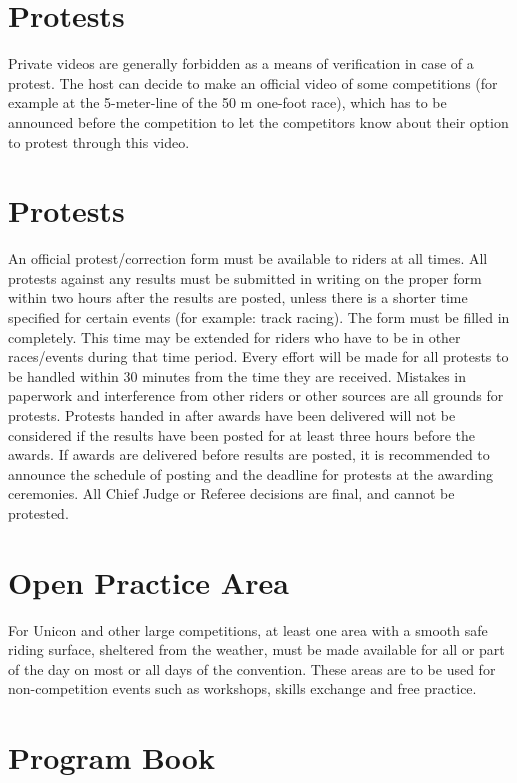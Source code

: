 \section{Protests}

Private videos are generally forbidden as a means of verification in case of a protest. 
The host can decide to make an official video of some competitions (for example at the 5-meter-line of the 50 m one-foot race), which has to be announced before the competition to let the competitors know about their option to protest through this video.

\section{Protests}
An official protest/correction form must be available to riders at all times.
All protests against any results must be submitted in writing on the proper form within two hours after the results are posted, unless there is a shorter time specified for certain events (for example: track racing).
The form must be filled in completely.
This time may be extended for riders who have to be in other races/events during that time period.
Every effort will be made for all protests to be handled within 30 minutes from the time they are received.
Mistakes in paperwork and interference from other riders or other sources are all grounds for protests.
Protests handed in after awards have been delivered will not be considered if the results have been posted for at least three hours before the awards.
If awards are delivered before results are posted, it is recommended to announce the schedule of posting and the deadline for protests at the awarding ceremonies.
All Chief Judge or Referee decisions are final, and cannot be protested.

\section{Open Practice Area}
For Unicon and other large competitions, at least one area with a smooth safe riding surface, sheltered from the weather, must be made available for all or part of the day on most or all days of the convention.
These areas are to be used for non-competition events such as workshops, skills exchange and free practice.

\section{Program Book}

